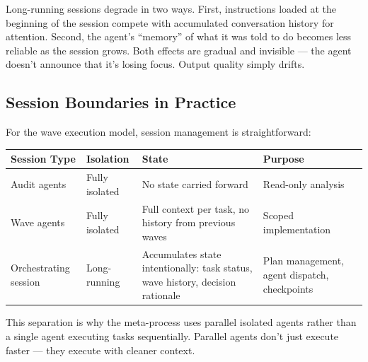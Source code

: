 \documentclass[
  a4paper,
  DIV=11,
  numbers=noendperiod]{scrreprt}
\newcounter{none} %
\begin{document}
Long-running sessions degrade in two ways. First, instructions loaded at
the beginning of the session compete with accumulated conversation
history for attention. Second, the agent's ``memory'' of what it was
told to do becomes less reliable as the session grows. Both effects are
gradual and invisible --- the agent doesn't announce that it's losing
focus. Output quality simply drifts.

\subsection{Session Boundaries in
Practice}\label{session-boundaries-in-practice}

For the wave execution model, session management is straightforward:

{\def\LTcaptype{none} %
\begin{longtable}[]{@{}
  >{\raggedright\arraybackslash}p{}
  >{\raggedright\arraybackslash}p{}
  >{\raggedright\arraybackslash}p{}
  >{\raggedright\arraybackslash}p{}@{}}
\toprule\noalign{}
\begin{minipage}[b]{\linewidth}\raggedright
Session Type
\end{minipage} & \begin{minipage}[b]{\linewidth}\raggedright
Isolation
\end{minipage} & \begin{minipage}[b]{\linewidth}\raggedright
State
\end{minipage} & \begin{minipage}[b]{\linewidth}\raggedright
Purpose
\end{minipage} \\
\midrule\noalign{}
\endhead
\bottomrule\noalign{}
\endlastfoot
Audit agents & Fully isolated & No state carried forward & Read-only
analysis \\
Wave agents & Fully isolated & Full context per task, no history from
previous waves & Scoped implementation \\
Orchestrating session & Long-running & Accumulates state intentionally:
task status, wave history, decision rationale & Plan management, agent
dispatch, checkpoints \\
\end{longtable}
}

This separation is why the meta-process uses parallel isolated agents
rather than a single agent executing tasks sequentially. Parallel agents
don't just execute faster --- they execute with cleaner context.
\end{document}
